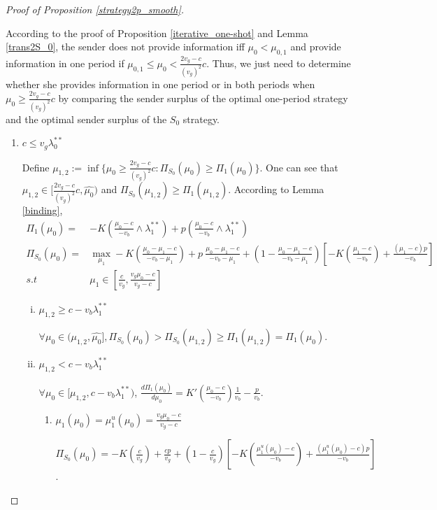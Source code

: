 \documentclass[11pt]{extarticle}
\newcommand{\m}{\wedge}
\begin{document}
\begin{proof}[Proof of Proposition \ref{strategy2p_smooth}]
\begin{enumerate}
		According to the proof of Proposition \ref{iterative_one-shot} and Lemma \ref{trans2S_0}, the sender does not provide information iff $\mu_0 < \mu_{0,1}$ and provide information in one period if $\mu_{0,1} \leq \mu_0 < \frac{2v_g-c}{(v_g)^2}c$. Thus, we just need to determine whether she provides information in one period or in both periods when $\mu_0 \geq \frac{2v_g-c}{(v_g)^2}c$ by comparing the sender surplus of the optimal one-period strategy and the optimal sender surplus of the $S_0$ strategy.
		
		\begin{enumerate}
			\item $c \leq v_g \lambda_0^{**}$
			
			Define $\mu_{1,2}:=\inf\{\mu_0\geq\frac{2v_g-c}{(v_g)^2}c:\Pi_{S_0}(\mu_0)\geq\Pi_1(\mu_0)\}$. One can see that $\mu_{1,2} \in [\frac{2v_g-c}{(v_g)^2}c,\widehat{\mu_0})$ and $\Pi_{S_0}(\mu_{1,2})\geq\Pi_1(\mu_{1,2})$. According to Lemma \ref{binding},
			\small
			\begin{align*}
			\Pi_1(\mu_0) =& -K(\frac{\mu_0-c}{-v_b}\m\lambda_1^{**})+p(\frac{\mu_0-c}{-v_b}\m\lambda_1^{**})\\
			\Pi_{S_0}(\mu_0) =&\max\limits_{\mu_1} -K(\frac{\mu_0-\mu_1-c}{-v_b-\mu_1}) + p~ \frac{\mu_0-\mu_1-c}{-v_b-\mu_1} + (1-\frac{\mu_0-\mu_1-c}{-v_b-\mu_1}) \left[-K(\frac{\mu_1-c}{-v_b})+\frac{(\mu_1-c)p}{-v_b}\right]\\
			s.t~&\mu_1\in \left[\frac{c}{v_g}, \frac{v_g\mu_0-c}{v_g-c} \right]
			\end{align*}
			\normalsize
			
			
			\begin{enumerate}[i)]
				\item $\mu_{1,2} \geq c - v_b\lambda_1^{**}$
				
				$\forall \mu_0 \in (\mu_{1,2}, \widehat{\mu_0}], \Pi_{S_0}(\mu_0) > \Pi_{S_0}(\mu_{1,2}) \geq \Pi_1(\mu_{1,2}) = \Pi_1(\mu_0)$.
				
				\item $\mu_{1,2} < c - v_b\lambda_1^{**}$
				
				$\forall \mu_0 \in [\mu_{1,2}, c - v_b\lambda_1^{**})$, $\frac{d \Pi_1(\mu_0)}{d \mu_0} =K'(\frac{\mu_0-c}{-v_b})\frac{1}{v_b}-\frac{p}{v_b}$.
				\begin{enumerate}
					\item $\mu_1(\mu_0) = \mu_1^u(\mu_0) = \frac{v_g\mu_0-c}{v_g-c}$
					
					$\Pi_{S_0}(\mu_0) =-K(\frac{c}{v_g})+\frac{cp}{v_g}+(1-\frac{c}{v_g})[-K(\frac{\mu_1^u(\mu_0)-c}{-v_b})+\frac{(\mu_1^u(\mu_0)-c)p}{-v_b}]$.
					

\end{enumerate}
\end{enumerate}
\end{enumerate}
\end{enumerate}
\end{proof}
\end{document}
